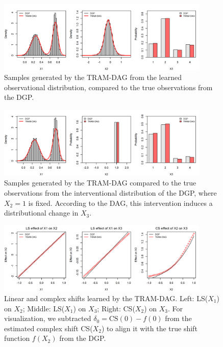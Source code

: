 \begin{figure}[htbp]
\centering
\includegraphics[width=0.9\textwidth]{img/exp1_observational_distribution.png}
\caption{Samples generated by the TRAM-DAG from the learned observational distribution, compared to the true observations from the DGP.}
\label{fig:exp1_observational_distribution}
\end{figure}




\begin{figure}[htbp]
\centering
\includegraphics[width=0.9\textwidth]{img/exp1_interventional_distribution.png}
\caption{Samples generated by the TRAM-DAG compared to the true observations from the interventional distribution of the DGP, where $X_2 = 1$ is fixed. According to the DAG, this intervention induces a distributional change in $X_3$.}
\label{fig:exp1_interventional_distribution}
\end{figure}



\begin{figure}[htbp]
\centering
\includegraphics[width=0.9\textwidth]{img/exp1_LS_CS.png}
\caption{Linear and complex shifts learned by the TRAM-DAG. Left: LS($X_1$) on $X_2$; Middle: LS($X_1$) on $X_3$; Right: CS($X_2$) on $X_3$. For visualization, we subtracted $\delta_0 = \text{CS}(0) - f(0)$ from the estimated complex shift CS($X_2$) to align it with the true shift function $f(X_2)$ from the DGP.}
\label{fig:exp1_shifts}
\end{figure}



